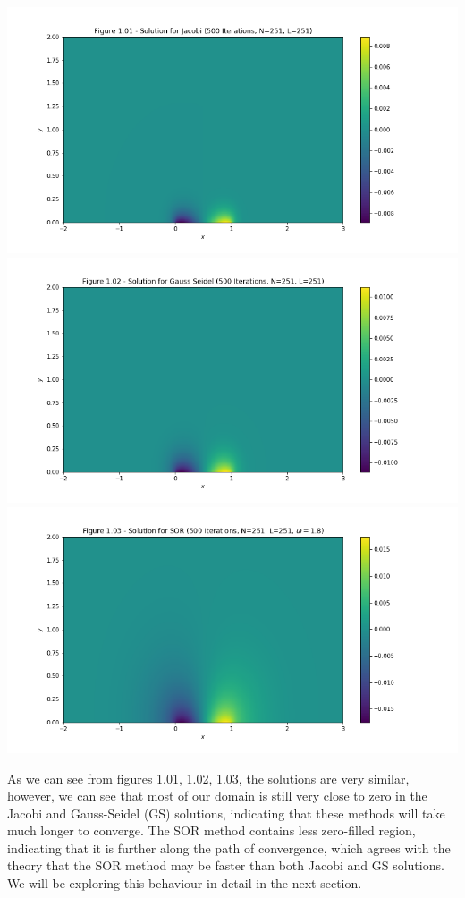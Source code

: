 \documentclass[12pt]{article}
\begin{document}
    \includegraphics[width=\textwidth]{fig1.01}
    \includegraphics[width=\textwidth]{fig1.02}
    \includegraphics[width=\textwidth]{fig1.03}

    As we can see from figures 1.01, 1.02, 1.03, the solutions are very similar, however, we can see that most of our domain is still very close to zero in the Jacobi and Gauss-Seidel (GS) solutions, indicating that these methods will take much longer to converge. The SOR method contains less zero-filled region, indicating that it is further along the path of convergence, which agrees with the theory that the SOR method may be faster than both Jacobi and GS solutions. We will be exploring this behaviour in detail in the next section.
\end{document}
